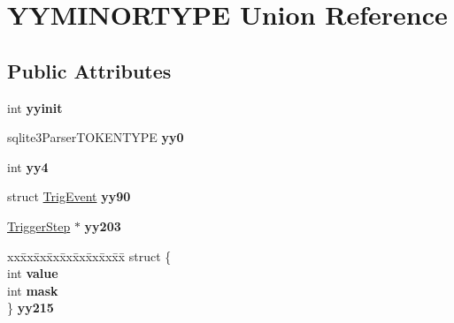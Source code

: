 \hypertarget{union_y_y_m_i_n_o_r_t_y_p_e}{}\section{Y\+Y\+M\+I\+N\+O\+R\+T\+Y\+PE Union Reference}
\label{union_y_y_m_i_n_o_r_t_y_p_e}
\subsection*{Public Attributes}
\begin{DoxyCompactItemize}
\item 
\mbox{\label{union_y_y_m_i_n_o_r_t_y_p_e_a6cec97309f473b42b70a9738d7cbd5ba}} 
int {\bfseries yyinit}
\item 
\mbox{\label{union_y_y_m_i_n_o_r_t_y_p_e_a827d6a1bc7ac8df062b3f419db3f50ac}} 
sqlite3\+Parser\+T\+O\+K\+E\+N\+T\+Y\+PE {\bfseries yy0}
\item 
\mbox{\label{union_y_y_m_i_n_o_r_t_y_p_e_ae433a4d120346e52c0a49a52f00addf7}} 
int {\bfseries yy4}
\item 
\mbox{\label{union_y_y_m_i_n_o_r_t_y_p_e_aff972d766a7c6e72d308c7ca352670a1}} 
struct \mbox{\hyperlink{struct_trig_event}{Trig\+Event}} {\bfseries yy90}
\item 
\mbox{\label{union_y_y_m_i_n_o_r_t_y_p_e_ada44002797ea649d714c8c08b01c1b67}} 
\mbox{\hyperlink{struct_trigger_step}{Trigger\+Step}} $\ast$ {\bfseries yy203}
\item 
\mbox{\label{union_y_y_m_i_n_o_r_t_y_p_e_a7c2cea1b4ee63f505b133f69915d2656}} 
\begin{tabbing}
xx\=xx\=xx\=xx\=xx\=xx\=xx\=xx\=xx\=\kill
struct \{\\
\>int {\bfseries value}\\
\>int {\bfseries mask}\\
\} {\bfseries yy215}\\


\end{tabbing}
\end{DoxyCompactItemize}
